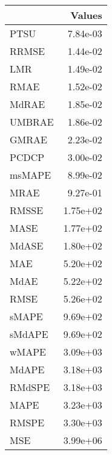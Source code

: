 \begin{tabular}{lr}
\toprule
 & Values \\
\midrule
PTSU & 7.84e-03 \\
RRMSE & 1.44e-02 \\
LMR & 1.49e-02 \\
RMAE & 1.52e-02 \\
MdRAE & 1.85e-02 \\
UMBRAE & 1.86e-02 \\
GMRAE & 2.23e-02 \\
PCDCP & 3.00e-02 \\
msMAPE & 8.99e-02 \\
MRAE & 9.27e-01 \\
RMSSE & 1.75e+02 \\
MASE & 1.77e+02 \\
MdASE & 1.80e+02 \\
MAE & 5.20e+02 \\
MdAE & 5.22e+02 \\
RMSE & 5.26e+02 \\
sMAPE & 9.69e+02 \\
sMdAPE & 9.69e+02 \\
wMAPE & 3.09e+03 \\
MdAPE & 3.18e+03 \\
RMdSPE & 3.18e+03 \\
MAPE & 3.23e+03 \\
RMSPE & 3.30e+03 \\
MSE & 3.99e+06 \\
\bottomrule
\end{tabular}
